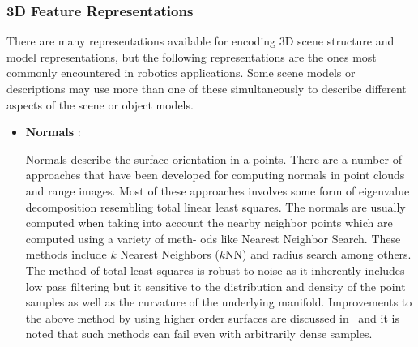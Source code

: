 \documentclass[twocolumn,oneside]{book}
\begin{document}
\subsubsection{3D Feature Representations}

There are many representations available for encoding 3D scene
structure and model representations, but the following representations
are the ones most commonly encountered in robotics applications. Some
scene models or descriptions may use more than one of these
simultaneously to describe different aspects of the scene or object
models.

\begin{itemize}

\item {\bf Normals }:

  Normals describe the surface orientation in a points. There are a
  number of approaches that have been developed for computing normals
  in point clouds and range images. Most of these approaches involves
  some form of eigenvalue decomposition resembling total linear least
  squares. The normals are usually computed when taking into account
  the nearby neighbor points which are computed using a variety of
  meth- ods like Nearest Neighbor Search. These methods include $k$
  Nearest Neighbors ($k$NN) and radius search among others. The method
  of total least squares is robust to noise as it inherently includes
  low pass filtering but it sensitive to the distribution and density
  of the point samples as well as the curvature of the underlying
  manifold. Improvements to the above method by using higher order
  surfaces are discussed in~\cite{Mitra_2003} and it is noted that
  such methods can fail even with arbitrarily dense samples.


\end{itemize}
\end{document}
